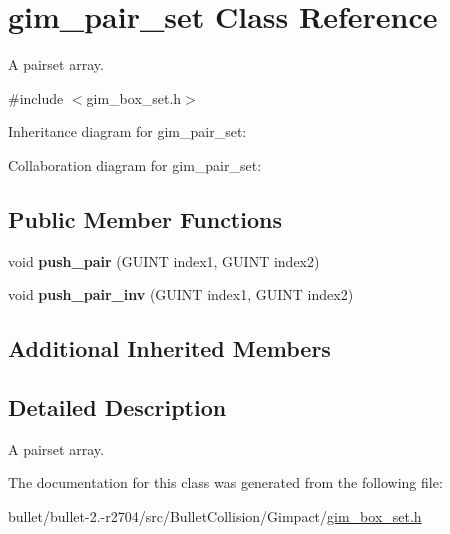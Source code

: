 \hypertarget{classgim__pair__set}{\section{gim\+\_\+pair\+\_\+set Class Reference}
\label{classgim__pair__set}
}


A pairset array.  




{\ttfamily \#include $<$gim\+\_\+box\+\_\+set.\+h$>$}



Inheritance diagram for gim\+\_\+pair\+\_\+set\+:


Collaboration diagram for gim\+\_\+pair\+\_\+set\+:
\subsection*{Public Member Functions}
\begin{DoxyCompactItemize}
\item 
\hypertarget{classgim__pair__set_a7e0cb8a54afd07dc417050303613e578}{void {\bfseries push\+\_\+pair} (G\+U\+I\+N\+T index1, G\+U\+I\+N\+T index2)}\label{classgim__pair__set_a7e0cb8a54afd07dc417050303613e578}

\item 
\hypertarget{classgim__pair__set_aa48f0ccf3c68ffc6e3b5d121323f3aea}{void {\bfseries push\+\_\+pair\+\_\+inv} (G\+U\+I\+N\+T index1, G\+U\+I\+N\+T index2)}\label{classgim__pair__set_aa48f0ccf3c68ffc6e3b5d121323f3aea}

\end{DoxyCompactItemize}
\subsection*{Additional Inherited Members}


\subsection{Detailed Description}
A pairset array. 

The documentation for this class was generated from the following file\+:\begin{DoxyCompactItemize}
\item 
bullet/bullet-\/2.-\/r2704/src/\+Bullet\+Collision/\+Gimpact/\hyperlink{gim__box__set_8h}{gim\+\_\+box\+\_\+set.\+h}\end{DoxyCompactItemize}
